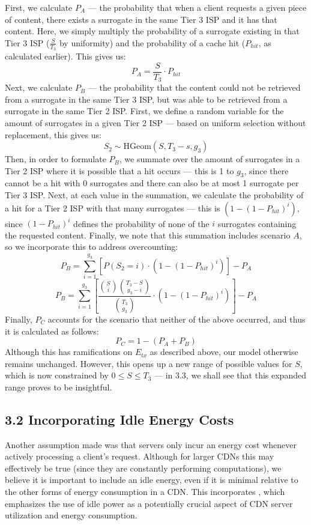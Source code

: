 \documentclass[
	a4paper, %
	10pt, %
	unnumberedsections, %
	twoside, %
]{LTJournalArticle}
\begin{document}
First, we calculate $P_A$ --- the probability that when a client requests a given piece of content, there exists a surrogate in the same Tier 3 ISP and it has that content. Here, we simply multiply the probability of a surrogate existing in that Tier 3 ISP ($\frac{S}{T_3}$ by uniformity) and the probability of a cache hit ($P_{hit}$, as calculated earlier). This gives us:
\[P_A = \frac{S}{T_3} \cdot P_{hit}\]
Next, we calculate $P_B$ --- the probability that the content could not be retrieved from a surrogate in the same Tier 3 ISP, but was able to be retrieved from a surrogate in the same Tier 2 ISP. First, we define a random variable for the amount of surrogates in a given Tier 2 ISP --- based on uniform selection without replacement, this gives us:
\[S_2 \sim \textrm{HGeom}(S, T_3-s, g_3)\]
Then, in order to formulate $P_B$, we summate over the amount of surrogates in a Tier 2 ISP where it is possible that a hit occurs --- this is 1 to $g_3$, since there cannot be a hit with 0 surrogates and there can also be at most 1 surrogate per Tier 3 ISP. Next, at each value in the summation, we calculate the probability of a hit for a Tier 2 ISP with that many surrogates --- this is $(1 - (1 - P_{hit})^i)$, since $(1 - P_{hit})^i$ defines the probability of none of the $i$ surrogates containing the requested content. Finally, we note that this summation includes scenario $A$, so we incorporate this to address overcounting:
\[P_B = \sum^{g_3}_{i=1}[P(S_2 = i) \cdot (1 - (1 - P_{hit})^i)] - P_A\]
\[P_B = \sum^{g_3}_{i=1}\left[\frac{\binom{S}{i}\binom{T_3-S}{g_3 - i}}{\binom{T_3}{g_3}} \cdot (1 - (1 - P_{hit})^i)\right] - P_A\]
Finally, $P_C$ accounts for the scenario that neither of the above occurred, and thus it is calculated as follows:
\[ P_C = 1 - (P_A + P_B)\]
Although this has ramifications on $E_{tx}$ as described above, our model otherwise remains unchanged. However, this opens up a new range of possible values for $S$, which is now constrained by $0 \leq S \leq T_3$ --- in 3.3, we shall see that this expanded range proves to be insightful.

\subsection{3.2 Incorporating Idle Energy Costs}
Another assumption made was that servers only incur an energy cost whenever actively processing a client's request. Although for larger CDNs this may effectively be true (since they are constantly performing computations),  we believe it is important to include an idle energy, even if it is minimal relative to the other forms of energy consumption in a CDN. This incorporates \cite{ulIslam2012}, which emphasizes the use of idle power as a potentially crucial aspect of CDN server utilization and energy consumption.
\end{document}
